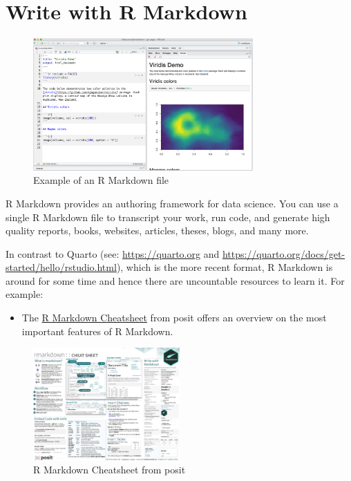 \documentclass[
  12pt,
  oneside]{book}
\providecommand{\tightlist}{%
  \setlength{\itemsep}{0pt}\setlength{\parskip}{0pt}}
\theoremstyle{definition}
\theoremstyle{definition}
\theoremstyle{definition}
\theoremstyle{definition}
\theoremstyle{remark}
\begin{document}
\hypertarget{write-with-r-markdown}{%
\chapter{Write with R Markdown}\label{write-with-r-markdown}}

\begin{figure}
\centering
\includegraphics[width=0.75\textwidth,height=\textheight]{fig/rmstudio.png}
\caption{\label{fig:examplermd} Example of an R Markdown file}
\end{figure}

R Markdown provides an authoring framework for data science. You can use a single
R Markdown file to transcript your work, run code, and generate high quality reports, books, websites, articles, theses, blogs, and many more.

In contrast to Quarto (see: \url{https://quarto.org} and \url{https://quarto.org/docs/get-started/hello/rstudio.html}), which is the more recent format, R Markdown is around for some time and hence there are uncountable resources to learn it. For example:

\begin{itemize}
\tightlist
\item
  The \href{https://raw.githubusercontent.com/rstudio/cheatsheets/main/rmarkdown.pdf}{R Markdown Cheatsheet} from posit offers an overview on the most important features of R Markdown.
\end{itemize}

\begin{figure}
\centering
\includegraphics[width=0.5\textwidth,height=\textheight]{fig/rmdcheat.png}
\caption{\label{fig:rmdcheat} R Markdown Cheatsheet from posit}
\end{figure}
\end{document}
